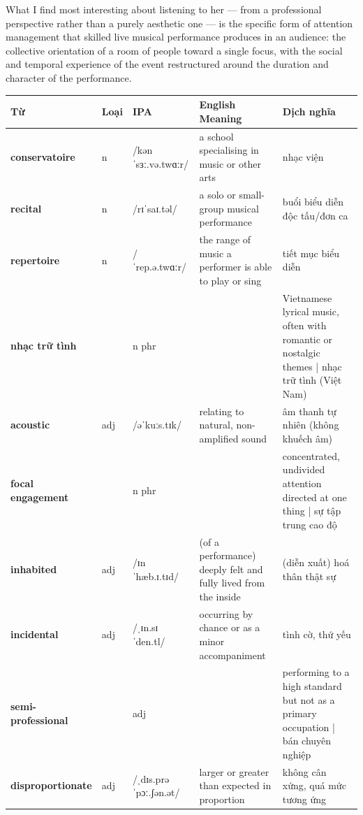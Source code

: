 \begin{ieltsanswer}
What I find most interesting about listening to her — from a professional perspective rather than a purely aesthetic one — is the specific form of attention management that skilled live musical performance produces in an audience: the collective orientation of a room of people toward a single focus, with the social and temporal experience of the event restructured around the duration and character of the performance.
\end{ieltsanswer}


\vspace{0.8em}
\begin{center}
\renewcommand{\arraystretch}{1.65}
\begin{tabularx}{\textwidth}{|V{0.22\textwidth}|C{0.07\textwidth}|I{0.20\textwidth}|Y|V{0.18\textwidth}|}
\hline
{}
\textbf{Từ} & \textbf{Loại} & \textbf{IPA} & \textbf{English Meaning} & \textbf{Dịch nghĩa} \\
\hline
\textbf{conservatoire} & n & /kənˈsɜː.və.twɑːr/ & a school specialising in music or other arts & nhạc viện \\ \hline
\textbf{recital} & n & /rɪˈsaɪ.təl/ & a solo or small-group musical performance & buổi biểu diễn độc tấu/đơn ca \\ \hline
\textbf{repertoire} & n & /ˈrep.ə.twɑːr/ & the range of music a performer is able to play or sing & tiết mục biểu diễn \\ \hline
\textbf{nhạc trữ tình} & & n phr & & Vietnamese lyrical music, often with romantic or nostalgic themes | nhạc trữ tình (Việt Nam) \\ \hline
\textbf{acoustic} & adj & /əˈkuːs.tɪk/ & relating to natural, non-amplified sound & âm thanh tự nhiên (không khuếch âm) \\ \hline
\textbf{focal engagement} & & n phr & & concentrated, undivided attention directed at one thing | sự tập trung cao độ \\ \hline
\textbf{inhabited} & adj & /ɪnˈhæb.ɪ.tɪd/ & (of a performance) deeply felt and fully lived from the inside & (diễn xuất) hoá thân thật sự \\ \hline
\textbf{incidental} & adj & /ˌɪn.sɪˈden.tl/ & occurring by chance or as a minor accompaniment & tình cờ, thứ yếu \\ \hline
\textbf{semi-professional} & & adj & & performing to a high standard but not as a primary occupation | bán chuyên nghiệp \\ \hline
\textbf{disproportionate} & adj & /ˌdɪs.prəˈpɔː.ʃən.ət/ & larger or greater than expected in proportion & không cân xứng, quá mức tương ứng \\ \hline
\end{tabularx}
\end{center}


